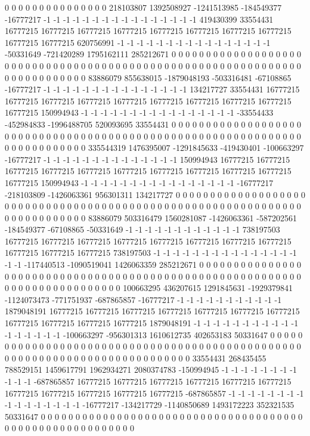 0 0 0 0 0 0 0 0 0 0 0 0 0 0 0 218103807 1392508927 -1241513985 -184549377 -16777217 -1 -1 -1 -1 -1 -1 -1 -1 -1 -1 -1 -1 -1 -1 -1 -1 419430399 33554431 16777215 16777215 16777215 16777215 16777215 16777215 16777215 16777215 16777215 16777215 620756991 -1 -1 -1 -1 -1 -1 -1 -1 -1 -1 -1 -1 -1 -1 -1 -1 -50331649 -721420289 1795162111 285212671 0 0 0 0 0 0 0 0 0 0 0 0 0 0 0 0 0 0 0 0 0 0 0 0 0 0 0 0 0 0 0 0 0 0 0 0 0 0 0 0 0 0 0 0 0 0 0 0 0 0 0 0 0 0 0 0 0 0 0
0 0 0 0 0 0 0 0 0 0 0 0 0 0 0 83886079 855638015 -1879048193 -503316481 -67108865 -16777217 -1 -1 -1 -1 -1 -1 -1 -1 -1 -1 -1 -1 -1 -1 -1 134217727 33554431 16777215 16777215 16777215 16777215 16777215 16777215 16777215 16777215 16777215 16777215 150994943 -1 -1 -1 -1 -1 -1 -1 -1 -1 -1 -1 -1 -1 -1 -1 -1 -33554433 -452984833 -1996488705 520093695 33554431 0 0 0 0 0 0 0 0 0 0 0 0 0 0 0 0 0 0 0 0 0 0 0 0 0 0 0 0 0 0 0 0 0 0 0 0 0 0 0 0 0 0 0 0 0 0 0 0 0 0 0 0 0 0 0 0 0 0
0 0 0 0 0 0 0 0 0 0 0 0 0 0 0 0 335544319 1476395007 -1291845633 -419430401 -100663297 -16777217 -1 -1 -1 -1 -1 -1 -1 -1 -1 -1 -1 -1 -1 -1 150994943 16777215 16777215 16777215 16777215 16777215 16777215 16777215 16777215 16777215 16777215 16777215 150994943 -1 -1 -1 -1 -1 -1 -1 -1 -1 -1 -1 -1 -1 -1 -1 -1 -16777217 -218103809 -1426063361 956301311 134217727 0 0 0 0 0 0 0 0 0 0 0 0 0 0 0 0 0 0 0 0 0 0 0 0 0 0 0 0 0 0 0 0 0 0 0 0 0 0 0 0 0 0 0 0 0 0 0 0 0 0 0 0 0 0 0 0 0 0
0 0 0 0 0 0 0 0 0 0 0 0 0 0 0 0 83886079 503316479 1560281087 -1426063361 -587202561 -184549377 -67108865 -50331649 -1 -1 -1 -1 -1 -1 -1 -1 -1 -1 -1 -1 738197503 16777215 16777215 16777215 16777215 16777215 16777215 16777215 16777215 16777215 16777215 16777215 738197503 -1 -1 -1 -1 -1 -1 -1 -1 -1 -1 -1 -1 -1 -1 -1 -1 -1 -117440513 -1090519041 1426063359 285212671 0 0 0 0 0 0 0 0 0 0 0 0 0 0 0 0 0 0 0 0 0 0 0 0 0 0 0 0 0 0 0 0 0 0 0 0 0 0 0 0 0 0 0 0 0 0 0 0 0 0 0 0 0 0 0 0 0 0
0 0 0 0 0 0 0 0 0 0 0 0 0 0 0 0 0 100663295 436207615 1291845631 -1929379841 -1124073473 -771751937 -687865857 -16777217 -1 -1 -1 -1 -1 -1 -1 -1 -1 -1 -1 1879048191 16777215 16777215 16777215 16777215 16777215 16777215 16777215 16777215 16777215 16777215 16777215 1879048191 -1 -1 -1 -1 -1 -1 -1 -1 -1 -1 -1 -1 -1 -1 -1 -1 -1 -100663297 -956301313 1610612735 402653183 50331647 0 0 0 0 0 0 0 0 0 0 0 0 0 0 0 0 0 0 0 0 0 0 0 0 0 0 0 0 0 0 0 0 0 0 0 0 0 0 0 0 0 0 0 0 0 0 0 0 0 0 0 0 0 0 0 0 0
0 0 0 0 0 0 0 0 0 0 0 0 0 0 0 0 0 0 33554431 268435455 788529151 1459617791 1962934271 2080374783 -150994945 -1 -1 -1 -1 -1 -1 -1 -1 -1 -1 -1 -687865857 16777215 16777215 16777215 16777215 16777215 16777215 16777215 16777215 16777215 16777215 16777215 -687865857 -1 -1 -1 -1 -1 -1 -1 -1 -1 -1 -1 -1 -1 -1 -1 -1 -16777217 -134217729 -1140850689 1493172223 352321535 50331647 0 0 0 0 0 0 0 0 0 0 0 0 0 0 0 0 0 0 0 0 0 0 0 0 0 0 0 0 0 0 0 0 0 0 0 0 0 0 0 0 0 0 0 0 0 0 0 0 0 0 0 0 0 0 0 0 0
